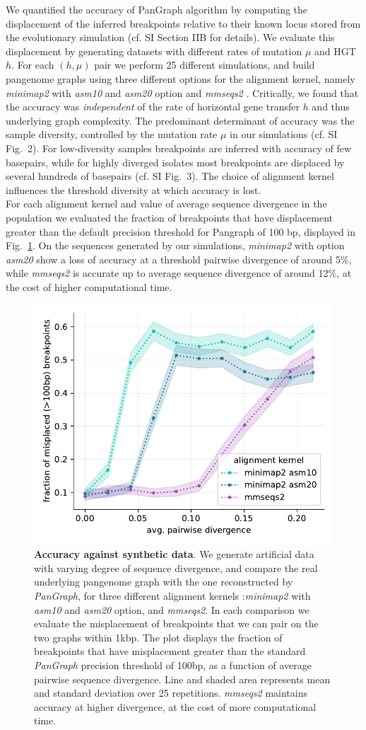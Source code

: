 \documentclass[aps,rmp,reprint,superscriptaddress,notitlepage,10pt]{revtex4-1}
\begin{document}
We quantified the accuracy of PanGraph algorithm by computing the displacement of the inferred breakpoints relative to their known locus stored from the evolutionary simulation (cf. SI Section IIB for details). We evaluate this displacement by generating datasets with different rates of mutation $\mu$ and HGT $h$. For each $(h,\mu)$ pair we perform 25 different simulations, and build pangenome graphs using three different options for the alignment kernel, namely \textit{minimap2} \cite{li2018minimap2} with \textit{asm10} and \textit{asm20} option and \textit{mmseqs2} \cite{steinegger2017mmseqs2}.
Critically, we found that the accuracy was \emph{independent} of the rate of horizontal gene transfer $h$ and thus underlying graph complexity. The predominant determinant of accuracy was the sample diversity, controlled by the mutation rate $\mu$ in our simulations (cf. SI Fig.~2). For low-diversity samples breakpoints are inferred with accuracy of few basepairs, while for highly diverged isolates most breakpoints are displaced by several hundreds of basepairs (cf. SI Fig.~3). The choice of alignment kernel influences the threshold diversity at which accuracy is lost.\\
For each alignment kernel and value of average sequence divergence in the population we evaluated the fraction of breakpoints that have displacement greater than the default precision threshold for Pangraph of 100 bp, displayed in Fig.~\ref{fig:toy-accuracy}. On the sequences generated by our simulations, \textit{minimap2} with option \textit{asm20} show a loss of accuracy at a threshold pairwise divergence of around 5\%, while \textit{mmseqs2} is accurate up to average sequence divergence of around 12\%, at the cost of higher computational time.

\begin{figure}[htb]
    \includegraphics[width=.4\textwidth]{figs/misplaced_fraction_vs_divergence.pdf}
    \caption{{\bf Accuracy against synthetic data}.
        We generate artificial data with varying degree of sequence divergence, and compare the real underlying pangenome graph with the one reconstructed by \textit{PanGraph}, for three different alignment kernels :\textit{minimap2} with \textit{asm10} and \textit{asm20} option, and \textit{mmseqs2}. In each comparison we evaluate the misplacement of breakpoints that we can pair on the two graphs within 1kbp. The plot displays the fraction of breakpoints that have misplacement greater than the standard \textit{PanGraph} precision threshold of 100bp, as a function of average pairwise sequence divergence. Line and shaded area represents mean and standard deviation over 25 repetitions. \textit{mmseqs2} maintains accuracy at higher divergence, at the cost of more computational time.
    }
    \label{fig:toy-accuracy}
\end{figure}
\end{document}
